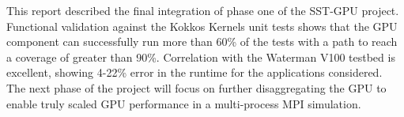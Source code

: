 This report described the final integration of phase one of the SST-GPU project.
Functional validation against the Kokkos Kernels unit tests shows that the GPU
component can successfully run more than 60\% of the tests with a path to reach
a coverage of greater than 90\%. Correlation with the Waterman V100 testbed is
excellent, showing 4-22\% error in the runtime for the applications considered.
The next phase of the project will focus on further disaggregating the GPU to
enable truly scaled GPU performance in a multi-process MPI simulation.
